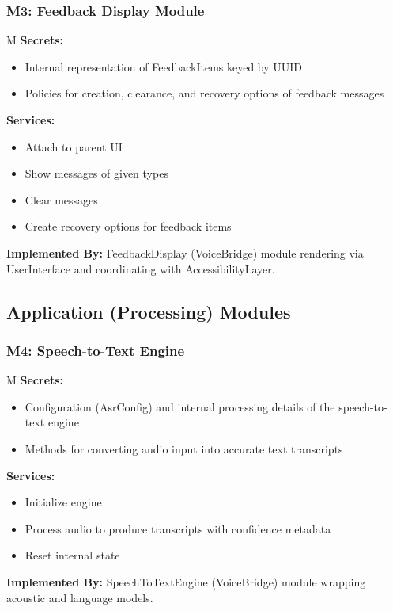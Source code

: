 \documentclass[12pt, titlepage]{article}
\newcounter{mnum}
\newcommand{\mthemnum}{M\themnum}
\begin{document}
\subsubsection*{M3: Feedback Display Module} \mthemnum\label{m3}
\textbf{Secrets:} 
\begin{itemize}
  \item Internal representation of FeedbackItems keyed by UUID
  \item Policies for creation, clearance, and recovery options of feedback messages
\end{itemize}
\textbf{Services:} 
\begin{itemize}
  \item Attach to parent UI
  \item Show messages of given types
  \item Clear messages
  \item Create recovery options for feedback items
\end{itemize}
\textbf{Implemented By:} FeedbackDisplay (VoiceBridge) module rendering via UserInterface and coordinating with AccessibilityLayer.

\subsection*{Application (Processing) Modules} 

\subsubsection*{M4: Speech-to-Text Engine} \mthemnum\label{m4}
\textbf{Secrets:} 
\begin{itemize}
  \item Configuration (AsrConfig) and internal processing details of the speech-to-text engine
  \item Methods for converting audio input into accurate text transcripts
\end{itemize}
\textbf{Services:} 
\begin{itemize}
  \item Initialize engine
  \item Process audio to produce transcripts with confidence metadata
  \item Reset internal state
\end{itemize}
\textbf{Implemented By:} SpeechToTextEngine (VoiceBridge) module wrapping acoustic and language models.
\end{document}
